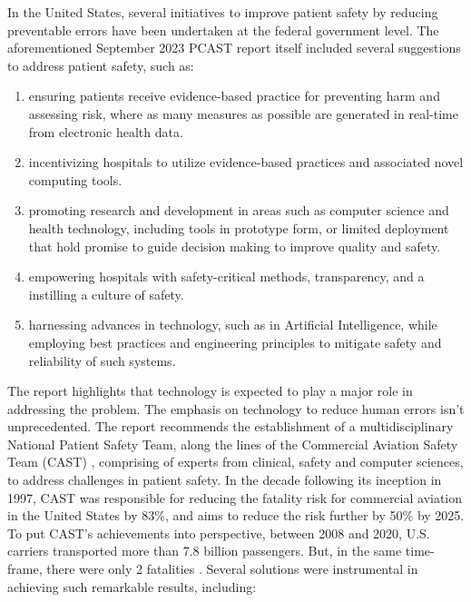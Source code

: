 In the United States, several initiatives to improve patient safety by
reducing preventable errors have been undertaken at the federal government
level. The aforementioned September 2023 PCAST report itself included several suggestions to
address patient safety, such as:
\begin{enumerate}[label=(\roman*)]
  \item ensuring patients receive evidence-based practice for preventing
    harm and assessing risk, where as many measures as possible are
    generated in real-time from electronic health data.
  \item incentivizing hospitals to utilize evidence-based practices
    and associated novel computing tools.
  \item promoting research and development in areas such as
    computer science and health technology,
    including tools in prototype form, or limited deployment that
    hold promise to guide decision making to improve quality and safety.
  \item empowering hospitals with safety-critical methods, transparency,
    and a instilling a culture of safety.
  \item harnessing advances in technology, such as in Artificial Intelligence,
    while employing best practices and engineering principles to mitigate safety
    and reliability of such systems.
\end{enumerate}
The report highlights that technology is expected to play a major role in
addressing the problem. The emphasis on technology to reduce human errors
isn't unprecedented. The report recommends the establishment of a
multidisciplinary National Patient Safety Team, along the lines of
the Commercial Aviation Safety Team (CAST) \cite{CASTUrl}, comprising of
experts from clinical, safety and computer sciences, to address challenges
in patient safety. In the decade following its inception in 1997,
CAST was responsible for reducing the fatality risk for commercial aviation
in the United States by 83\%, and aims to reduce the risk further by 50\% by
2025. To put CAST's achievements into perspective, between 2008 and 2020,
U.S. carriers transported more than 7.8 billion passengers. But, in the same
time-frame, there were only 2 fatalities \cite{CASTSafetyReport20}.
Several solutions were instrumental in achieving such remarkable results, including:
